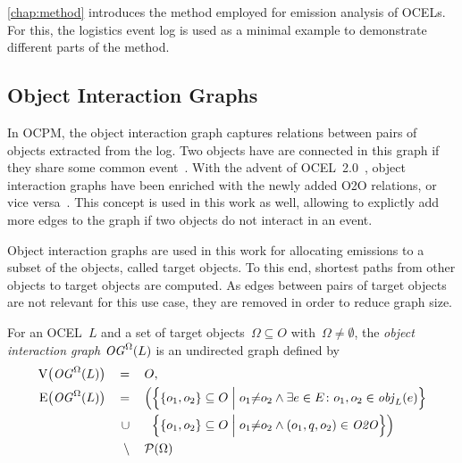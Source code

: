 \autoref{chap:method} introduces the method employed for emission analysis of OCELs.
For this, the logistics event log is used as a minimal example to demonstrate different parts of the method.

\subsection{Object Interaction Graphs}
\label{ssec:prelim-ocel-og}

In OCPM, the object interaction graph captures relations between pairs of objects extracted from the log.
Two objects have are connected in this graph if they share some common event~\cite{Fahland22process,Adams22defining}.
With the advent of OCEL~2.0~\cite{OCEL2}, object interaction graphs have been enriched with the newly added O2O relations, or vice versa~\cite{Liss24totem}.
This concept is used in this work as well,
allowing to explictly add more edges to the graph if two objects do not interact in an event.

Object interaction graphs are used in this work for allocating emissions to a subset of the objects, called target objects.
To this end, shortest paths from other objects to target objects are computed.
As edges between pairs of target objects are not relevant for this use case, they are removed in order to reduce graph size.

\begin{nobreaks}
  \begin{definition}
    For an OCEL~$L$ and a set of target objects~$\Omega\subseteq O$ with~$\Omega\neq\emptyset$, the \textit{object interaction graph} $\mathit{OG}^\Omega(L)$ is an undirected graph defined by
    \begin{alignat*}{6}
      \operatorname{V}\bigl(\mathit{OG}^\Omega(L)\bigr) &\,&=&&\,& O, \\
      \operatorname{E}\bigl(\mathit{OG}^\Omega(L)\bigr) &&=&&&
        \Bigl(\Bigl\{
          \{ o_1, o_2 \} \subseteq O
        \Bigm|
          o_1 {\neq} o_2 \land
          \exists e\in E \colon o_1,o_2 \in\mathit{obj}_L(e)
        \Bigr\} \\
        &&\cup&&&
        \hphantom{\Big(} \Bigl\{
          \{o_1,o_2\} \subseteq O
        \Bigm|
          o_1 {\neq} o_2 \land
          (o_1,q,o_2)\in\mathit{O2O}
        \Bigr\} \Bigr) \\
        &&\setminus&&& \mathcal{P}(\Omega)
    \end{alignat*}
    \label{def:og}
  \end{definition}
\end{nobreaks}

